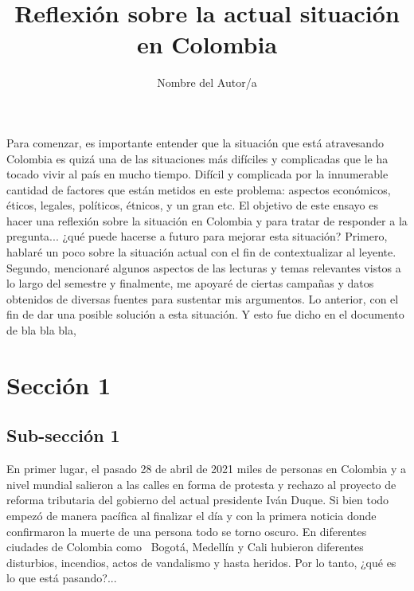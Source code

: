 \documentclass[doc, 12pt, letterpaper, donotrepeattitle, floatsintext, apacite]{apa6}    %
\title{\Large Reflexión sobre la actual situación en Colombia}
\author{Nombre del Autor/a}
\affiliation{Universidad de los Andes\\ Materia en Curso\\ Código: 123456789}
\begin{document}
\vspace*{-2cm}      %
\maketitle          %


\doublespacing %

Para comenzar, es importante entender que la situación que está atravesando Colombia es quizá una de las situaciones más difíciles y complicadas que le ha tocado vivir al país en mucho tiempo. Difícil y complicada por la innumerable cantidad de factores que están metidos en este problema: aspectos económicos, éticos, legales, políticos, étnicos, y un gran etc. El objetivo de este ensayo es hacer una reflexión sobre la situación en Colombia y para tratar de responder a la pregunta... ¿qué puede hacerse a futuro para mejorar esta situación? Primero, hablaré un poco sobre la situación actual con el fin de contextualizar al leyente. Segundo, mencionaré algunos aspectos de las lecturas y temas relevantes vistos a lo largo del semestre y finalmente, me apoyaré de ciertas campañas y datos obtenidos de diversas fuentes para sustentar mis argumentos. Lo anterior, con el fin de dar una posible solución a esta situación. Y esto fue dicho en el documento de bla bla bla, \cite{lamport1986}



\section{\large Sección 1}
\subsection{Sub-sección 1} 
En primer lugar, el pasado 28 de abril de 2021 miles de personas en Colombia y a nivel mundial salieron a las calles en forma de protesta y rechazo al proyecto de reforma tributaria del gobierno del actual presidente Iván Duque. Si bien todo empezó de manera pacífica al finalizar el día y con la primera noticia donde confirmaron la muerte de una persona todo se torno oscuro. En diferentes ciudades de Colombia como \ Bogotá, Medellín y Cali hubieron diferentes disturbios, incendios, actos de vandalismo y hasta heridos. Por lo tanto, ¿qué es lo que está pasando?...
\end{document}
